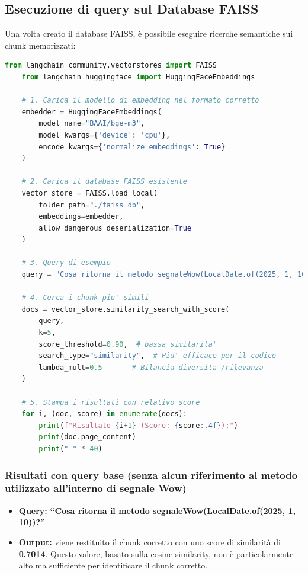 \documentclass[12pt,a4paper,openright,twoside]{book}
\begin{document}
\subsection{Esecuzione di query sul Database FAISS}
    Una volta creato il database FAISS, è possibile eseguire ricerche semantiche sui chunk memorizzati:

    \begin{lstlisting}[language=Python, caption={Esecuzione di una query sul database FAISS}, label={lst:query}]
    from langchain_community.vectorstores import FAISS
    from langchain_huggingface import HuggingFaceEmbeddings

    # 1. Carica il modello di embedding nel formato corretto
    embedder = HuggingFaceEmbeddings(
        model_name="BAAI/bge-m3",
        model_kwargs={'device': 'cpu'},
        encode_kwargs={'normalize_embeddings': True}
    )

    # 2. Carica il database FAISS esistente
    vector_store = FAISS.load_local(
        folder_path="./faiss_db",
        embeddings=embedder,
        allow_dangerous_deserialization=True
    )

    # 3. Query di esempio
    query = "Cosa ritorna il metodo segnaleWow(LocalDate.of(2025, 1, 10))?"

    # 4. Cerca i chunk piu' simili
    docs = vector_store.similarity_search_with_score(
        query,
        k=5,
        score_threshold=0.90,  # bassa similarita'
        search_type="similarity",  # Piu' efficace per il codice
        lambda_mult=0.5       # Bilancia diversita'/rilevanza
    )

    # 5. Stampa i risultati con relativo score
    for i, (doc, score) in enumerate(docs):
        print(f"Risultato {i+1} (Score: {score:.4f}):")
        print(doc.page_content)
        print("-" * 40)
    \end{lstlisting}

    \subsubsection{Risultati con query base (senza alcun riferimento al metodo utilizzato all'interno di segnale Wow)}
    \begin{itemize}
        \item \textbf{Query:} 
            \newline
                \textbf{``Cosa ritorna il metodo segnaleWow(LocalDate.of(2025, 1, 10))?''}
            \newline
        \item \textbf{Output:}
        viene restituito il chunk corretto con uno score di similarità di \textbf{0.7014}. Questo valore, basato sulla cosine similarity, non è particolarmente alto ma sufficiente per identificare il chunk corretto.
    \end{itemize}
\end{document}
